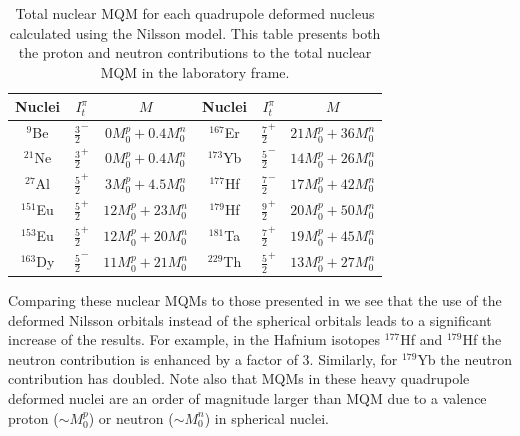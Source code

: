 \documentclass[10pt,a4paper, twoside]{report}
\begin{document}
\begin{table}
\label{table:NuclearMQM}
\caption[Nulcear MQM for deformed nuclei of interest.]{Total nuclear MQM for each quadrupole deformed nucleus calculated  using the Nilsson model. This table presents both the proton and neutron contributions to the total nuclear MQM in the laboratory frame. }
\begin{tabular}{ccc|ccc}
\toprule
\toprule
\parbox{1.5cm}{Nuclei}   & $I_t^{\pi}$ &  $M$ & \parbox{1.5cm}{Nuclei} & $I_t^{\pi}$ & $M$ \\
\midrule
$^9$Be     & $\tfrac{3}{2}^-$ & $0M_{0}^{p} + 0.4M_{0}^{n}$ &  $^{167}$Er & $\tfrac{7}{2}^+$ & $21M_{0}^{p} +36M_{0}^{n}$\\[5pt]
$^{21}$Ne  & $\tfrac{3}{2}^+$ & $0M_{0}^{p} + 0.4M_{0}^{n}$ &  $^{173}$Yb & $\tfrac{5}{2}^-$ & $14M_{0}^{p} +26M_{0}^{n}$\\[5pt]
$^{27}$Al  & $\tfrac{5}{2}^+$ & $3M_{0}^{p} + 4.5M_{0}^{n}$ &  $^{177}$Hf & $\tfrac{7}{2}^-$ & $17M_{0}^{p} +42M_{0}^{n}$\\[5pt]
$^{151}$Eu & $\tfrac{5}{2}^+$ & $12M_{0}^{p} + 23M_{0}^{n}$   &  $^{179}$Hf & $\tfrac{9}{2}^+$ & $20M_{0}^{p} + 50M_{0}^{n}$\\[5pt]
$^{153}$Eu & $\tfrac{5}{2}^+$ & $12M_{0}^{p} + 20M_{0}^{n}$   &  $^{181}$Ta & $\tfrac{7}{2}^+$ & $19M_{0}^{p} + 45M_{0}^{n}$\\[5pt]
$^{163}$Dy & $\tfrac{5}{2}^-$ & $11M_{0}^{p} + 21M_{0}^{n}$  &  $^{229}$Th & $\tfrac{5}{2}^+$ & $13M_{0}^{p} + 27M_{0}^{n}$\\[5pt]
\bottomrule
\bottomrule
\end{tabular}

\end{table}

Comparing these nuclear MQMs to those presented in \cite{Flambaum2014} we see that the use of the deformed Nilsson orbitals instead of the spherical orbitals leads to a  significant increase of the results. For example, in the Hafnium isotopes $^{177}$Hf and  $^{179}$Hf the neutron contribution is enhanced by a factor of 3.  Similarly, for $^{179}$Yb the neutron contribution has doubled.  Note also that  MQMs in these heavy quadrupole deformed nuclei are an order of magnitude larger than MQM due to a valence proton   ($ \sim M_{0}^{p}$)  or neutron  ($\sim M_{0}^{n}$) in spherical nuclei.
\end{document}
